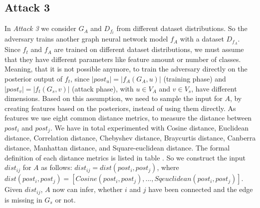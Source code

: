     \subsection{Attack 3}
      In \emph{Attack 3} we consider $G_A$ and $D_{f_t}$ from different dataset distributions.
      So the adversary trains another graph neural network model $f_A$ with a dataset $D_{f_A}$.
      Since $f_t$ and $f_A$ are trained on different dataset distributions, we must assume that they have different parameters like feature amount or number of classes. 
      Meaning, that it is not possible anymore, to train the adversary directly on the posterior output of $f_t$, since $|post_u| = |f_A(G_A,u)|$ (training phase) and $|post_v| = |f_t(G_s,v)|$ (attack phase), with $u \in V_A$ and $v \in V_s$, have different dimensions.
      Based on this assumption, we need to sample the input for $A$, by creating features based on the posteriors, instead of using them directly.
      As features we use eight common distance metrics, to measure the distance between $post_i$ and $post_j$.
      We have in total experimented with Cosine distance, Euclidean distance, Correlation distance, Chebyshev distance, Braycurtis distance, Canberra distance, Manhattan distance, and Square-euclidean distance.
      The formal definition of each distance metrics is listed in table .
      So we construct the input $dist_{ij}$ for $A$ as follows: $dist_{ij} = dist(post_i, post_j)$, where $dist(post_i, post_j) = [Cosine(post_i,post_j), ..., Sqeuclidean(post_i,post_j)]$.
      Given $dist_{ij}$, $A$ now can infer, whether $i$ and $j$ have been connected and the edge is missing in $G_s$ or not.

